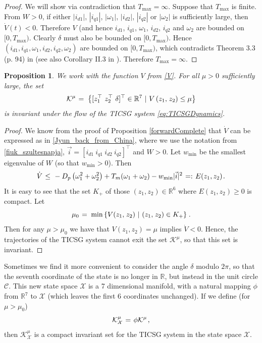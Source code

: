\documentclass[letterpaper,10pt,conference]{ieeeconf}
\newtheorem{proposition}[theorem]{Proposition}
\newcommand{\rline}  {{\mathbb R}}
\renewcommand{\o}    {{\omega}}
\newcommand{\m}      {{\hbox{\hskip 1pt}}}
\newcommand{\Cmscr}  {{\mathcal{C}}}
\newcommand{\Kmscr}  {{\mathcal{K}}}
\newcommand{\Xmscr}  {{\mathcal{X}}}
\begin{document}
\begin{proof}
We will show via contradiction that ${T_{\max}}=\infty$.  Suppose that
$T_{\max}$ is finite. From $W>0$, if either $|i_{d1}|$, $|i_{q1}|$,
$|\o_1|$, $|i_{d2}|$, $|i_{q2}|$ or $|\o_2|$ is sufficiently large,
then $\dot{V}(t)<0$. Therefore $V$ (and hence $i_{d1}$, $i_{q1}$,
$\o_1$, $i_{d2}$, $i_{q2}$ and $\o_2$ are bounded on
$[0,{T_{\max}})$. Clearly $\delta$ must also be bounded on
$[0,{T_{\max}})$. Hence $(i_{d1}, i_{q1},\o_1,i_{d2},i_{q2},\o_2)$ are
bounded on $[0,{T_{\max}})$, which contradicts Theorem 3.3 (p. 94) in
\cite{Khalil} (see also Corollary II.3 in \cite{JayWeissBS:09}). 
Therefore $T_{\max}=\infty$.
\end{proof}

\begin{proposition} \label{Superland}
We work with the function $V$ from \eqref{V}. For all $\mu>0$ 
sufficiently large, the set \vspace{-1mm}
$$ \Kmscr^\mu \m=\m \left\{ [z_1^\top\ z_2^\top\ \delta]^\top\in
   \rline^7\ |\ V\left(z_1,\m z_2\right)\leq\mu \right\}$$
is invariant under the flow of the TICSG system 
\eqref{eq:TICSGDynamics}.
\end{proposition}

\medskip
\begin{proof} We know from the proof of Proposition 
\ref{forwardComplete} that $\dot{V}$ can be expressed as in
\eqref{Jyun_back_from_China}, where we use the notation from
\eqref{fiuk_szultesnapja}, $\vec{i}=[i_{d1}\ i_{q1}\ i_{d2}\ 
i_{q2}]^\top$ and $W>0$. Let $w_{\min}$ be the smallest eigenvalue of 
$W$ (so that $w_{\min}>0$). Then 
$$\dot{V} \m\leq\m -D_p\left( \o_1^2+\o_2^2\right) + T_m(\o_1+\o_2)
   -w_{\min}|\vec{i}|^2 \m=:\m E(z_1,z_2) \m.$$
It is easy to see that the set $K_+$ of those $(z_1,z_2)\in\rline^6$ 
where $E(z_1,z_2)\geq 0$ is compact. Let 
$$ \mu_0 \m=\m \min \left\{ V(z_1,\m z_2)\ |\ (z_1,\m z_2)\in K_+
   \right\} \m.$$
Then for any $\mu>\mu_0$ we have that $V(z_1,z_2)=\mu$ implies
$\dot{V}<0$. Hence, the trajectories of the TICSG system cannot exit
the set $\Kmscr^\mu$, so that this set is invariant.
\end{proof}

Sometimes we find it more convenient to consider the angle $\delta$
modulo $2\pi$, so that the seventh coordinate of the state is no 
longer in $\rline$, but instead in the unit circle $\Cmscr$. This 
new state space $\Xmscr$ is a 7 dimensional manifold, with a natural
mapping $\phi$ from $\rline^7$ to $\Xmscr$ (which leaves the first 6
coordinates unchanged). If we define (for $\mu>\mu_0$)
$$\Kmscr^\mu_{\Xmscr} \m=\m \phi \Kmscr^\mu \m,$$
then $\Kmscr^\mu_{\Xmscr}$ is a compact invariant set for the 
TICSG system in the state space $\Xmscr$.
 
\end{document}

